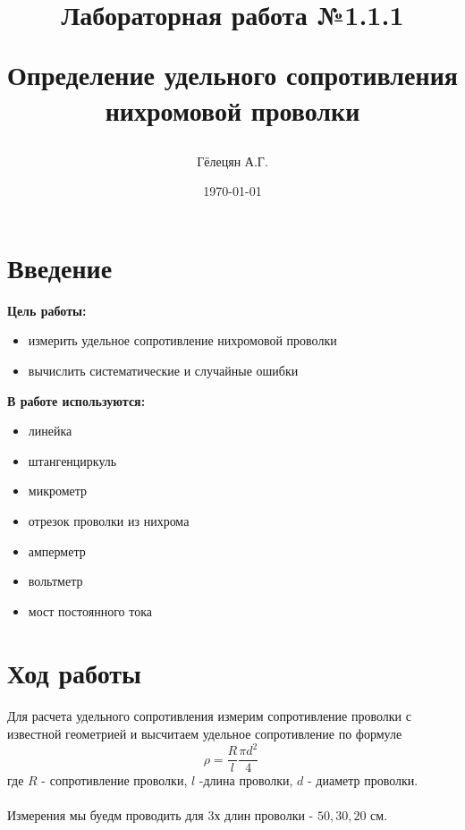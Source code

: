 \documentclass[a4paper, 12pt]{article}
\title{\begin{center}Лабораторная работа №1.1.1\end{center}
Определение удельного сопротивления нихромовой проволки}
\author{Гёлецян А.Г.}
\date{\today}
\begin{document}
    \maketitle
    \newpage

    \section{Введение}
    \textbf{Цель работы:}
    \begin{itemize}
        \item измерить удельное сопротивление нихромовой проволки
        \item вычислить систематические и случайные ошибки
    \end{itemize}

    \vspace{1cm}

    \textbf{В работе используются: }
    \begin{itemize}
        \item линейка
        \item штангенциркуль
        \item микрометр
        \item отрезок проволки из нихрома
        \item амперметр
        \item вольтметр
        \item мост постоянного тока
    \end{itemize}

    \newpage
    \section{Ход работы}
    \paragraph{}
    Для расчета удельного сопротивления измерим сопротивление проволки с известной геометрией и высчитаем удельное сопротивление по формуле
    \begin{equation}
        \rho = \frac{R}{l}\frac{\pi d^{2}}{4}\
    \end{equation}
    где $R$ - сопротивление проволки, $l$ -длина проволки, $d$ - диаметр проволки.

    \paragraph{}
    Измерения мы буедм проводить для 3х длин проволки - $50, 30, 20$ $см$.
\end{document}
